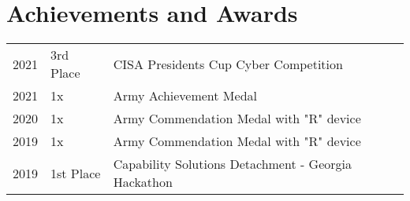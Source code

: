 \documentclass[]{resume}
\begin{document}
\begin{minipage}[t]{0.69\textwidth}


\section{Achievements and Awards}
\begin{tabular}{rll}
2021         & 3rd Place  & CISA Presidents Cup Cyber Competition \\
2021         & 1x         & Army Achievement Medal \\
2020		 & 1x         & Army Commendation Medal with "R" device \\
2019         & 1x         & Army Commendation Medal with "R" device \\
2019         & 1st Place  & Capability Solutions Detachment - Georgia Hackathon
\end{tabular}


\end{minipage}

%
%

\end{document}
